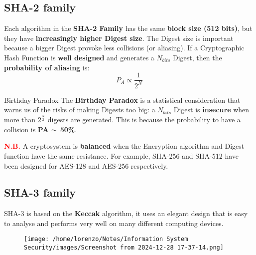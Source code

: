 \subsection{SHA-2 family}
Each algorithm in the \textbf{SHA-2 Family} has the same \textbf{block size (512 bits)}, but they have \textbf{increasingly higher Digest size}. The Digest size is important because a bigger Digest provoke less collisions (or aliasing).
If a Cryptographic Hash Function is \textbf{well designed} and generates a \(N_{bits}\) Digest, then the \textbf{probability of aliasing} is: \[P_A \propto \frac{1}{2^N}\]
\vspace{-0.3cm}
\begin{center}
    \begin{quotebox-red}{Birthday Paradox}
        The \textbf{Birthday Paradox} is a statistical consideration that warns us of the risks of making Digests too big: a \(N_{bits}\) Digest is \textbf{insecure} when more than \(2^{\frac{N}{2}}\) digests are generated. This is because the probability to have a collision is \textbf{PA \(\thicksim\) 50\%}.
    \end{quotebox-red}
\end{center}
\textcolor{red}{\textbf{N.B.}} A cryptosystem is \textbf{balanced} when the Encryption algorithm and Digest function have the same resistance. For example, SHA-256 and SHA-512 have been designed for AES-128 and AES-256 respectively.
\subsection{SHA-3 family}
SHA-3 is based on the \textbf{Keccak} algorithm, it uses an elegant design that is easy to analyse and performs very well on many different computing devices.
\begin{figure}[H]
    \centering
    \texttt{[image: /home/lorenzo/Notes/Information System Security/images/Screenshot from 2024-12-28 17-37-14.png]}
\end{figure}
